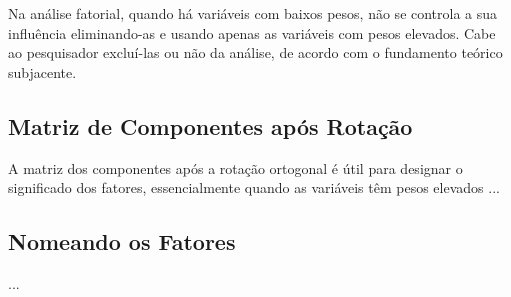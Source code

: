         Na análise fatorial, quando há variáveis com baixos pesos, não se controla a sua influência eliminando-as e usando apenas as variáveis com pesos elevados. Cabe ao pesquisador excluí-las ou não da análise, de acordo com o fundamento teórico subjacente.
        
    \subsection{Matriz de Componentes após Rotação}
    
        A matriz dos componentes após a rotação ortogonal é útil para designar o significado dos fatores, essencialmente quando as variáveis têm pesos elevados ...
        
    \subsection{Nomeando os Fatores}
    
    ...
